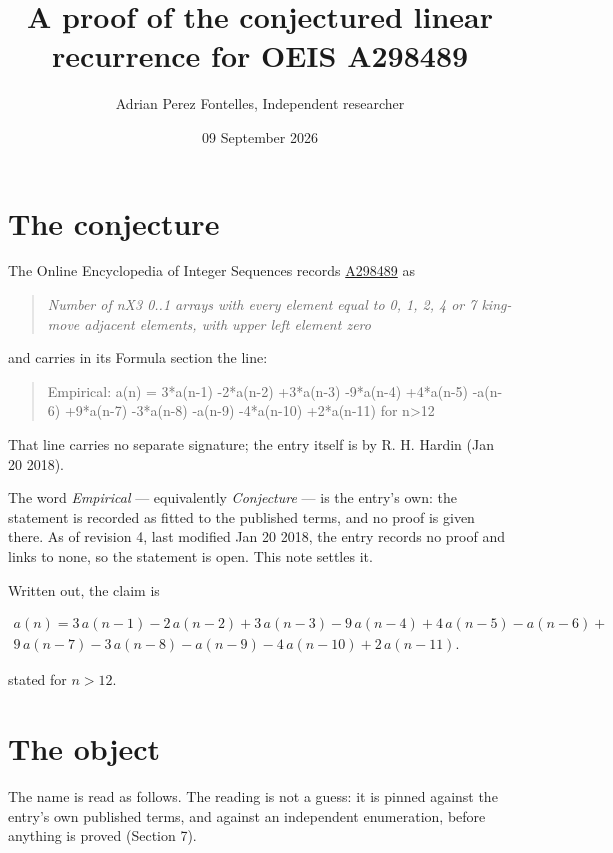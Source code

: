\documentclass[11pt]{article}
\title{A proof of the conjectured linear recurrence for OEIS A298489}
\author{Adrian Perez Fontelles, Independent researcher}
\date{09 September 2026}
\theoremstyle{definition}
\begin{document}
\maketitle
\section{The conjecture}

The Online Encyclopedia of Integer Sequences records \href{https://oeis.org/A298489}{A298489} as

\begin{quote}\itshape Number of nX3 0..1 arrays with every element equal to 0, 1, 2, 4 or 7 king-move adjacent elements, with upper left element zero\end{quote}

and carries in its Formula section the line:

\begin{quote}\ttfamily Empirical: a(n) = 3*a(n-1) -2*a(n-2) +3*a(n-3) -9*a(n-4) +4*a(n-5) -a(n-6) +9*a(n-7) -3*a(n-8) -a(n-9) -4*a(n-10) +2*a(n-11) for n>12\end{quote}

That line carries no separate signature; the entry itself is by R. H. Hardin (Jan 20 2018).

The word {\itshape Empirical} --- equivalently {\itshape Conjecture} --- is the entry's own: the statement is recorded as fitted to the published terms, and no proof is given there. As of revision 4, last modified Jan 20 2018, the entry records no proof and links to none, so the statement is open. This note settles it.

Written out, the claim is

\begin{multline*} a(n) = 3\,a(n-1) - 2\,a(n-2) + 3\,a(n-3) - 9\,a(n-4) + 4\,a(n-5) - a(n-6) + \\ 9\,a(n-7) - 3\,a(n-8) - a(n-9) - 4\,a(n-10) + 2\,a(n-11). \end{multline*}

stated for $n > 12$.

\section{The object}

The name is read as follows. The reading is not a guess: it is pinned against the entry's own published terms, and against an independent enumeration, before anything is proved (Section 7).
\end{document}
